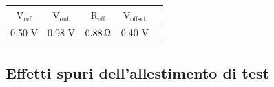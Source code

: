 
\begin{center}
\begin{tabular}{ccccc}
\hline
$\mathrm{V_{ref}}$ & $\mathrm{V_{out}}$ & $\mathrm{R_{eff}}$ & $\mathrm{V_{offset}}$ \\
\hline
0.50 V & 0.98 V & $0.88{\rm \, \Omega}$ & 0.40 V\\
\hline
\end{tabular}
\end{center}
\FloatBarrier

\subsection{Effetti spuri dell'allestimento di test}

